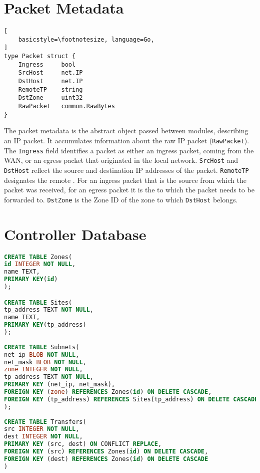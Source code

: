 \chapter{Packet Metadata}
\label{apdx:meta}


\begin{lstlisting}[
	basicstyle=\footnotesize, language=Go,
]
type Packet struct {
	Ingress		bool
	SrcHost 	net.IP
	DstHost 	net.IP
	RemoteTP	string
	DstZone		uint32
	RawPacket 	common.RawBytes
}
\end{lstlisting}

The packet metadata is the abstract object passed between modules, describing an IP packet. 
It accumulates information about the raw IP packet (\texttt{RawPacket}). The \texttt{Ingress} 
field identifies a packet as either an ingress packet, coming from the WAN, or an egress packet 
that originated in the local network. \texttt{SrcHost} and \texttt{DstHost} reflect the source 
and destination IP addresses of the packet. \texttt{RemoteTP} designates the remote \tp. For an 
ingress packet that is the source \tp from which the packet was received, for an egress packet 
it is the \tp to which the packet needs to be forwarded to. \texttt{DstZone} is the Zone ID of 
the zone to which \texttt{DstHost} belongs.

\chapter{Controller Database}
\label{apdx:controllerdb}


\begin{lstlisting}[language=sql, basicstyle=\tiny, %or \small or \footnotesize etc.
]
CREATE TABLE Zones(
id INTEGER NOT NULL,
name TEXT,
PRIMARY KEY(id)
);

CREATE TABLE Sites(
tp_address TEXT NOT NULL,
name TEXT,
PRIMARY KEY(tp_address)
);
	  
CREATE TABLE Subnets(
net_ip BLOB NOT NULL,
net_mask BLOB NOT NULL,
zone INTEGER NOT NULL,
tp_address TEXT NOT NULL,
PRIMARY KEY (net_ip, net_mask),
FOREIGN KEY (zone) REFERENCES Zones(id) ON DELETE CASCADE,
FOREIGN KEY (tp_address) REFERENCES Sites(tp_address) ON DELETE CASCADE
);
	  
CREATE TABLE Transfers(
src INTEGER NOT NULL,
dest INTEGER NOT NULL,
PRIMARY KEY (src, dest) ON CONFLICT REPLACE,
FOREIGN KEY (src) REFERENCES Zones(id) ON DELETE CASCADE,
FOREIGN KEY (dest) REFERENCES Zones(id) ON DELETE CASCADE	
)
\end{lstlisting}

